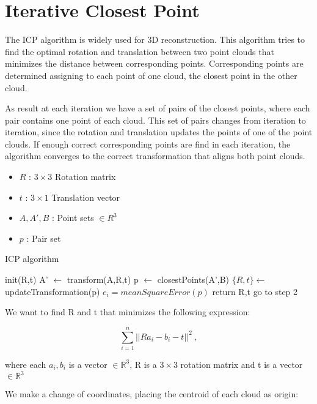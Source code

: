 
\section{Iterative Closest Point}

The ICP algorithm \cite{mckay92} is widely used for 3D reconstruction. This algorithm tries to find 
the optimal rotation and translation between two point clouds that minimizes the distance between corresponding 
points. Corresponding points are determined assigning to each point of one cloud, the closest point in the other cloud.

As result at each iteration we have a set of pairs of the closest points, where each pair contains one point of each cloud. This set 
of pairs changes from iteration to iteration, since the rotation and translation updates the points of one of the point clouds. If enough correct 
corresponding points are find in each iteration, the algorithm converges to the correct transformation that aligns both point clouds.


\begin{itemize}
\item $R$ : $3\times3$ Rotation matrix
\item $t$ : $3\times1$ Translation vector
\item $A,A',B$ : Point sets $\in R^3$
\item $p$ : Pair set
\end{itemize}
\begin{algorithm}
\caption{ICP algorithm}
\begin{algorithmic}[1]
\State init(R,t)
\State A' $\leftarrow$ transform(A,R,t) 
\State p $\leftarrow$ closestPoints(A',B)
\State $\{R,t\} \gets$ updateTransformation(p)
\State $e_i = meanSquareError(p)$
	\State return R,t
\Else
	\State go to step 2
\EndIf
\end{algorithmic}
\end{algorithm}


We want to find R and t that minimizes the following expression:

$$ \sum\limits_{i=1}^n ||R a_i -  b_i - t ||^2 \ ,$$

\noindent where each $a_i,b_i$ is a vector $\in \mathbb{R}^3$, R is a $3\times3$ rotation matrix and t is a vector $\in \mathbb{R}^3$


We make a change of coordinates, placing the centroid of each cloud as origin:



